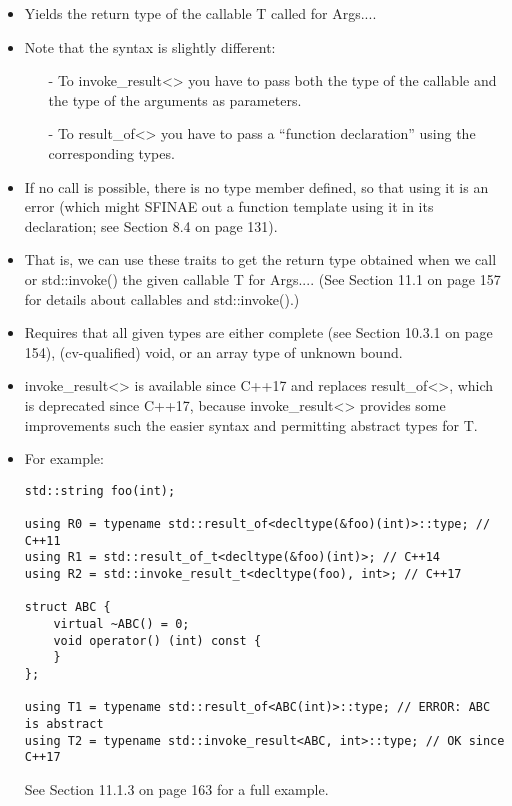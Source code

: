 \begin{itemize}
\item 
Yields the return type of the callable T called for Args....

\item 
Note that the syntax is slightly different:

\begin{itemize}
\item [-]
To invoke\_result<> you have to pass both the type of the callable and the type of the arguments as parameters.

\item [-]
To result\_of<> you have to pass a “function declaration” using the corresponding types.
\end{itemize}

\item 
If no call is possible, there is no type member defined, so that using it is an error (which might SFINAE out a function template using it in its declaration; see Section 8.4 on page 131).

\item 
That is, we can use these traits to get the return type obtained when we call or std::invoke() the given callable T for Args.... (See Section 11.1 on page 157 for details about callables and std::invoke().)

\item 
Requires that all given types are either complete (see Section 10.3.1 on page 154), (cv-qualified) void, or an array type of unknown bound.

\item 
invoke\_result<> is available since C++17 and replaces result\_of<>, which is deprecated since C++17, because invoke\_result<> provides some improvements such the easier syntax and permitting abstract types for T.

\item 
For example:
\begin{lstlisting}[style=styleCXX]
std::string foo(int);

using R0 = typename std::result_of<decltype(&foo)(int)>::type; // C++11
using R1 = std::result_of_t<decltype(&foo)(int)>; // C++14
using R2 = std::invoke_result_t<decltype(foo), int>; // C++17

struct ABC {
	virtual ~ABC() = 0;
	void operator() (int) const {
	}
};

using T1 = typename std::result_of<ABC(int)>::type; // ERROR: ABC is abstract
using T2 = typename std::invoke_result<ABC, int>::type; // OK since C++17
\end{lstlisting}

See Section 11.1.3 on page 163 for a full example.

\end{itemize}

